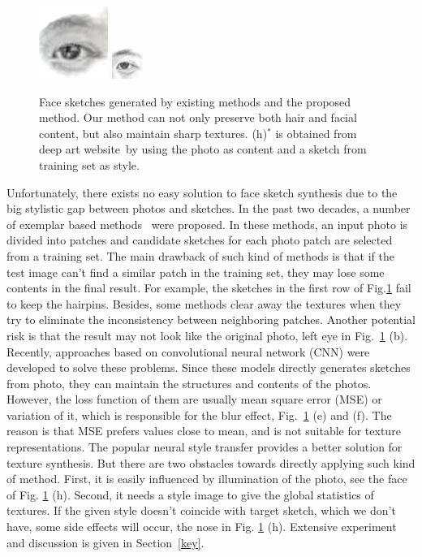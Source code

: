 \documentclass[10pt,twocolumn,letterpaper]{article}
\begin{document}
\begin{figure}[t]
\begin{minipage}[t]{1\linewidth}
\includegraphics[width=0.11\linewidth]{img/eye_deepart.jpg}
\includegraphics[width=0.11\linewidth]{img/eye_ours.png}
\end{minipage}
\caption[Caption for LOF]{Face sketches generated by existing methods and the proposed method. Our method can not only preserve both hair and facial content, but also maintain sharp textures. \setcounter{footnote}{0} (h)$^*$ is obtained from deep art website\footnotemark~by using the photo as content and a sketch from training set as style.}
\label{fig:example_comp}
\end{figure}

Unfortunately, there exists no easy solution to face sketch synthesis due to the big stylistic gap between photos and sketches. In the past two decades, a number of exemplar based methods~\cite{wang2009face,song2014real, zhang2010lighting,zhou2012markov} were proposed. In these methods, an input photo is divided into patches and candidate sketches for each photo patch are selected from a training set. The main drawback of such kind of methods is that if the test image can't find a similar patch in the training set, they may lose some contents in the final result. For example, the sketches in the first row of Fig.\ref{fig:example_comp} fail to keep the hairpins. Besides, some methods \cite{song2014real,zhou2012markov} clear away the textures when they try to eliminate the inconsistency between neighboring patches. Another potential risk is that the result may not look like the original photo, \eg left eye in Fig.~\ref{fig:example_comp} (b). Recently, approaches \cite{zhang2017content,zhang2015end} based on convolutional neural network (CNN) were developed to solve these problems. Since these models directly generates sketches from photo, they can maintain the structures and contents of the photos. However, the loss function of them are usually mean square error (MSE) or variation of it, which is responsible for the blur effect, \eg Fig.~\ref{fig:example_comp} (e) and (f). The reason is that MSE prefers values close to mean, and is not suitable for texture representations. The popular neural style transfer provides a better solution for texture synthesis. But there are two obstacles towards directly applying such kind of method. First, it is easily influenced by illumination of the photo, see the face of Fig. \ref{fig:example_comp} (h). Second, it needs a style image to give the global statistics of textures. If the given style doesn't coincide with target sketch, which we don't have, some side effects will occur, \eg the nose in Fig. \ref{fig:example_comp} (h). Extensive experiment and discussion is given in Section~\ref{key}. 
\end{document}
